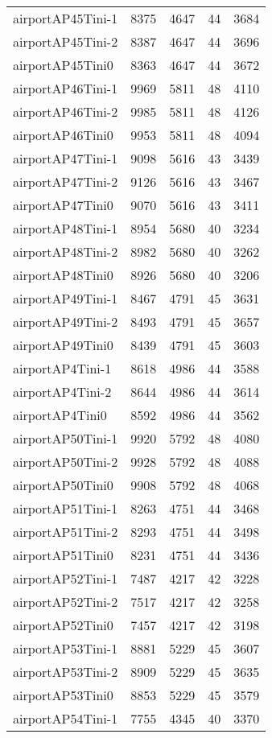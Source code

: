 \begin{longtable}{lrrrr}
airportAP45Tini-1 & 8375 & 4647 & 44 & 3684 \\
airportAP45Tini-2 & 8387 & 4647 & 44 & 3696 \\
airportAP45Tini0 & 8363 & 4647 & 44 & 3672 \\
airportAP46Tini-1 & 9969 & 5811 & 48 & 4110 \\
airportAP46Tini-2 & 9985 & 5811 & 48 & 4126 \\
airportAP46Tini0 & 9953 & 5811 & 48 & 4094 \\
airportAP47Tini-1 & 9098 & 5616 & 43 & 3439 \\
airportAP47Tini-2 & 9126 & 5616 & 43 & 3467 \\
airportAP47Tini0 & 9070 & 5616 & 43 & 3411 \\
airportAP48Tini-1 & 8954 & 5680 & 40 & 3234 \\
airportAP48Tini-2 & 8982 & 5680 & 40 & 3262 \\
airportAP48Tini0 & 8926 & 5680 & 40 & 3206 \\
airportAP49Tini-1 & 8467 & 4791 & 45 & 3631 \\
airportAP49Tini-2 & 8493 & 4791 & 45 & 3657 \\
airportAP49Tini0 & 8439 & 4791 & 45 & 3603 \\
airportAP4Tini-1 & 8618 & 4986 & 44 & 3588 \\
airportAP4Tini-2 & 8644 & 4986 & 44 & 3614 \\
airportAP4Tini0 & 8592 & 4986 & 44 & 3562 \\
airportAP50Tini-1 & 9920 & 5792 & 48 & 4080 \\
airportAP50Tini-2 & 9928 & 5792 & 48 & 4088 \\
airportAP50Tini0 & 9908 & 5792 & 48 & 4068 \\
airportAP51Tini-1 & 8263 & 4751 & 44 & 3468 \\
airportAP51Tini-2 & 8293 & 4751 & 44 & 3498 \\
airportAP51Tini0 & 8231 & 4751 & 44 & 3436 \\
airportAP52Tini-1 & 7487 & 4217 & 42 & 3228 \\
airportAP52Tini-2 & 7517 & 4217 & 42 & 3258 \\
airportAP52Tini0 & 7457 & 4217 & 42 & 3198 \\
airportAP53Tini-1 & 8881 & 5229 & 45 & 3607 \\
airportAP53Tini-2 & 8909 & 5229 & 45 & 3635 \\
airportAP53Tini0 & 8853 & 5229 & 45 & 3579 \\
airportAP54Tini-1 & 7755 & 4345 & 40 & 3370 \\

\end{longtable}
